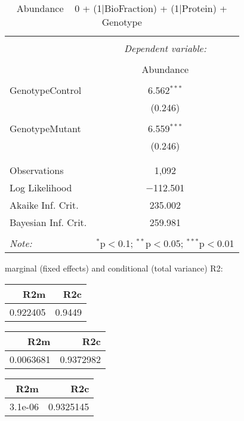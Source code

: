 \documentclass[11pt]{report}
\begin{document}
\begin{table}[!htbp] \centering 
  \caption{Abundance ~ 0 + (1|BioFraction) + (1|Protein) + Genotype} 
  \label{} 
\begin{tabular}{@{\extracolsep{5pt}}lc} 
\\[-1.8ex]\hline 
\hline \\[-1.8ex] 
 & \multicolumn{1}{c}{\textit{Dependent variable:}} \\ 
\cline{2-2} 
\\[-1.8ex] & Abundance \\ 
\hline \\[-1.8ex] 
 GenotypeControl & 6.562$^{***}$ \\ 
  & (0.246) \\ 
  & \\ 
 GenotypeMutant & 6.559$^{***}$ \\ 
  & (0.246) \\ 
  & \\ 
\hline \\[-1.8ex] 
Observations & 1,092 \\ 
Log Likelihood & $-$112.501 \\ 
Akaike Inf. Crit. & 235.002 \\ 
Bayesian Inf. Crit. & 259.981 \\ 
\hline 
\hline \\[-1.8ex] 
\textit{Note:}  & \multicolumn{1}{r}{$^{*}$p$<$0.1; $^{**}$p$<$0.05; $^{***}$p$<$0.01} \\ 
\end{tabular} 
\end{table} 
marginal (fixed effects) and conditional (total variance) R2:

\begin{tabular}{r|r}
\hline
R2m & R2c\\
\hline
0.922405 & 0.9449\\
\hline
\end{tabular}

\begin{tabular}{r|r}
\hline
R2m & R2c\\
\hline
0.0063681 & 0.9372982\\
\hline
\end{tabular}

\begin{tabular}{r|r}
\hline
R2m & R2c\\
\hline
3.1e-06 & 0.9325145\\
\hline
\end{tabular}
\end{document}
